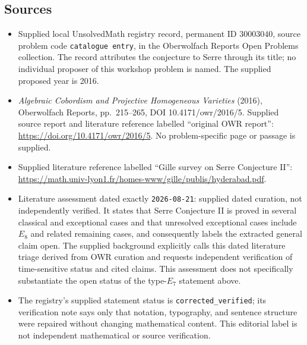 \documentclass[11pt]{article}
\begin{document}
\subsection{Sources}
\begin{itemize}
\item Supplied local UnsolvedMath registry record, permanent ID \(30003040\), source problem code \texttt{catalogue entry}, in the Oberwolfach Reports Open Problems collection. The record attributes the conjecture to Serre through its title; no individual proposer of this workshop problem is named. The supplied proposed year is 2016.
\item \emph{Algebraic Cobordism and Projective Homogeneous Varieties} (2016), Oberwolfach Reports, pp.~215--265, DOI 10.4171/owr/2016/5. Supplied source report and literature reference labelled ``original OWR report'': \url{https://doi.org/10.4171/owr/2016/5}. No problem-specific page or passage is supplied.
\item Supplied literature reference labelled ``Gille survey on Serre Conjecture II'': \url{https://math.univ-lyon1.fr/homes-www/gille/publis/hyderabad.pdf}.
\item Literature assessment dated exactly \texttt{2026-08-21}: supplied dated curation, not independently verified. It states that Serre Conjecture II is proved in several classical and exceptional cases and that unresolved exceptional cases include \(E_8\) and related remaining cases, and consequently labels the extracted general claim open. The supplied background explicitly calls this dated literature triage derived from OWR curation and requests independent verification of time-sensitive status and cited claims. This assessment does not specifically substantiate the open status of the type-\(E_7\) statement above.
\item The registry's supplied statement status is \texttt{corrected\_verified}; its verification note says only that notation, typography, and sentence structure were repaired without changing mathematical content. This editorial label is not independent mathematical or source verification.
\end{itemize}
\end{document}
